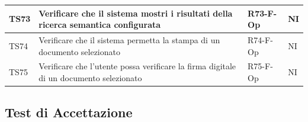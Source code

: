 \documentclass[a4paper,12pt]{article}
\begin{document}
\begin{longtable}{|M{1.2cm}|M{6.3cm}|M{2.5cm}|M{1.5cm}|}
                TS73 & Verificare che il sistema mostri i risultati della ricerca semantica configurata & R73-F-Op & NI \\
                \hline
                                
                TS74 & Verificare che il sistema permetta la stampa di un documento selezionato & R74-F-Op & NI \\
                \hline
                                
                TS75 & Verificare che l'utente possa verificare la firma digitale di un documento selezionato & R75-F-Op & NI \\
                \hline
            \end{longtable}

        \subsection{Test di Accettazione}
        
\end{document}
